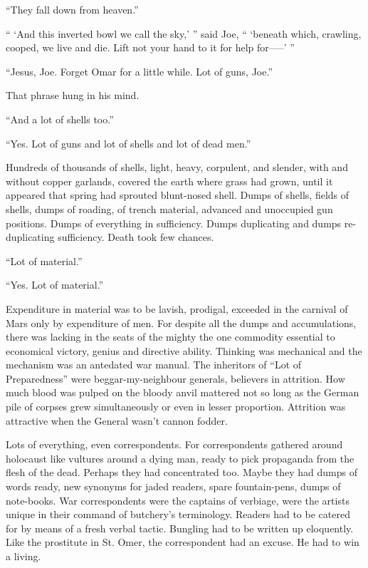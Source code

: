 ``They fall down from heaven.''

`` `And this inverted bowl we call the sky,' '' said Joe, `` `beneath which, crawling, cooped, we live and die. Lift not your hand to it for help for-----' ''

``Jesus, Joe. Forget Omar for a little while. Lot of guns, Joe.''

That phrase hung in his mind.

``And a lot of shells too.''

``Yes. Lot of guns and lot of shells and lot of dead men.''

Hundreds of thousands of shells, light, heavy, corpulent, and slender, with and without copper garlands, covered the earth where grass had grown, until it appeared that spring had sprouted blunt-nosed shell. Dumps of shells, fields of shells, dumps of roading, of trench material, advanced and unoccupied gun positions. Dumps of everything in sufficiency. Dumps duplicating and dumps re-duplicating sufficiency. Death took few chances.

``Lot of material.''

``Yes. Lot of material.''

Expenditure in material was to be lavish, prodigal, exceeded in the carnival of Mars only by expenditure of men. For despite all the dumps and accumulations, there was lacking in the seats of the mighty the one commodity essential to economical victory, genius and directive ability. Thinking was mechanical and the mechanism was an antedated war manual. The inheritors of ``Lot of Preparedness'' were beggar-my-neighbour generals, believers in attrition. How much blood was pulped on the bloody anvil mattered not so long as the German pile of corpses grew simultaneously or even in lesser proportion. Attrition was attractive when the General wasn't cannon fodder.

Lots of everything, even correspondents. For correspondents gathered around holocaust like vultures around a dying man, ready to pick propaganda from the flesh of the dead. Perhaps they had concentrated too. Maybe they had dumps of words ready, new synonyms for jaded readers, spare fountain-pens, dumps of note-books. War correspondents were the captains of verbiage, were the artists unique in their command of butchery's terminology. Readers had to be catered for by means of a fresh verbal tactic. Bungling had to be written up eloquently. Like the prostitute in St. Omer, the correspondent had an excuse. He had to win a living.

